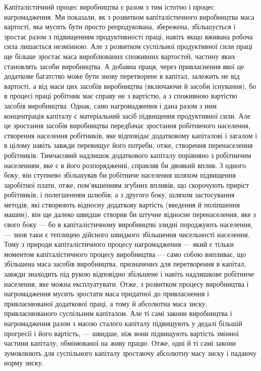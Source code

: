 Капіталістичний процес виробництва є разом з тим істотно і
процес нагромадження. Ми показали, як з розвитком капіталістичного
виробництва маса вартості, яка мусить бути просто
репродукована, збережена, збільшується і зростає разом з
підвищенням продуктивності праці, навіть якщо вживана робоча
сила лишається незмінною. Але з розвитком суспільної продуктивної
сили праці ще більше зростає маса вироблюваних споживних
вартостей, частину яких становлять засоби виробництва.
А добавна праця, через привласнення якої це додаткове багатство
може бути знову перетворене в капітал, залежить не від вартості,
а від маси цих засобів виробництва (включаючи й засоби
існування), бо в процесі праці робітник має справу не з вартістю,
а з споживною вартістю засобів виробництва. Однак, само
нагромадження і дана разом з ним концентрація капіталу є
матеріальний засіб підвищення продуктивної сили. Але це зростання
засобів виробництва передбачає зростання робітничого
населення, створення населення робітників, яке відповідає додатковому
капіталові і загалом і в цілому навіть завжди перевищує
його потреби, отже, створення перенаселення робітників.
Тимчасовий надлишок додаткового капіталу порівняно з робітничим
населенням, яке є в його розпорядженні, справляв би
двоякий вплив. З одного боку, він ступнево збільшував би робітниче
населення шляхом підвищення заробітної плати, отже,
пом’якшенням згубних впливів, що скорочують приріст робітників,
і полегшенням шлюбів; а з другого боку, шляхом застосування
методів, які створюють відносну додаткову вартість (введення
й поліпшення машин), він ще далеко швидше створив би
штучне відносне перенаселення, яке з свого боку — бо в капіталістичному
виробництві злидні породжують населення, — знов таки є
теплицею дійсного швидкого збільшення чисельності населення.
Тому з природи капіталістичного процесу нагромадження —
який є тільки моментом капіталістичного процесу виробництва —
само собою випливає, що збільшена маса засобів виробництва,
призначених для перетворення в капітал, завжди знаходить під
рукою відповідно збільшене і навіть надлишкове робітниче населення,
яке можна експлуатувати. Отже, з розвитком процесу
виробництва і нагромадження мусить зростати маса придатної
до привласнення і привласнюваної додаткової праці, а тому й абсолютна
маса зиску, привласнюваного суспільним капіталом. Але ті
самі закони виробництва і нагромадження разом з масою сталого
капіталу підвищують у дедалі більшій прогресії і його вартість, —
швидше, ніж вони підвищують вартість змінної частини капіталу,
обмінюваної на живу працю. Отже, одні й ті самі закони зумовлюють
для суспільного капіталу зростаючу абсолютну масу
зиску і падаючу норму зиску.

